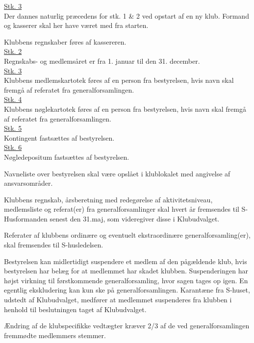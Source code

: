 \begin{list}
\underline{Stk. 3}\\
Der dannes naturlig præcedens for stk. 1 \& 2 ved opstart af en ny klub. Formand og kasserer skal her have været med fra starten.
\item Klubbens regnskaber føres af kassereren.\\

\underline{Stk. 2}\\ 
Regnskabs- og medlemsåret er fra 1. januar til den 31. december.\\

\underline{Stk. 3}\\ 
Klubbens medlemskartotek føres af en person fra bestyrelsen, hvis navn skal fremgå af referatet fra generalforsamlingen.\\

\underline{Stk. 4}\\ 
Klubbens nøglekartotek føres af en person fra bestyrelsen, hvis navn skal fremgå af referatet fra generalforsamlingen.\\

\underline{Stk. 5}\\
Kontingent fastsættes af bestyrelsen.\\

\underline{Stk. 6}\\
Nøgledepositum fastsættes af bestyrelsen.
\item Navneliste over bestyrelsen skal være opslået i klublokalet med angivelse af ansvarsområder.
\item Klubbens regnskab, årsberetning med redegørelse af aktivitetsniveau, medlemsliste og referat(er) fra generalforsamlinger skal hvert år fremsendes til S-Husformanden senest den 31.maj, som videregiver disse i Klubudvalget.
\item Referater af klubbens ordinære og eventuelt ekstraordinære generalforsamling(er), skal fremsendes til S-husledelsen.
\item Bestyrelsen kan midlertidigt suspendere et medlem af den pågældende klub, hvis bestyrelsen har belæg for at medlemmet har skadet klubben. Suspenderingen har højst virkning til førstkommende generalforsamling, hvor sagen tages op igen. En egentlig ekskludering kan kun ske på generalforsamlingen. Karantæne fra S-huset, udstedt af Klubudvalget, medfører at medlemmet suspenderes fra klubben i henhold til beslutningen taget af Klubudvalget.
\item Ændring af de klubspecifikke vedtægter kræver 2/3 af de ved generalforsamlingen fremmødte medlemmers stemmer.\\


\end{list}
